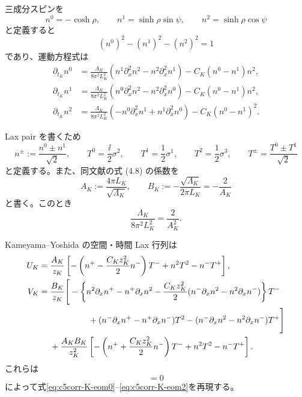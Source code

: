三成分スピンを
\begin{equation}
n^0=-\cosh\rho,
\qquad n^1=\sinh\rho\sin\psi,
\qquad n^2=\sinh\rho\cos\psi
\label{eq:c5corr-K-spin-rhopsi}
\end{equation}
と定義すると
\begin{equation}
(n^0)^2-(n^1)^2-(n^2)^2=1
\label{eq:c5corr-Kspin}
\end{equation}
であり、運動方程式は
\begin{align}
\partial_{t_K}n^0
&=\frac{\Lambda_K}{8\pi^2L_K^2}
(n^1\partial_x^2n^2-n^2\partial_x^2n^1)
-C_K(n^0-n^1)n^2,
\label{eq:c5corr-K-eom0}\\
\partial_{t_K}n^1
&=\frac{\Lambda_K}{8\pi^2L_K^2}
(n^0\partial_x^2n^2-n^2\partial_x^2n^0)
-C_K(n^0-n^1)n^2,
\label{eq:c5corr-K-eom1}\\
\partial_{t_K}n^2
&=\frac{\Lambda_K}{8\pi^2L_K^2}
(-n^0\partial_x^2n^1+n^1\partial_x^2n^0)
-C_K(n^0-n^1)^2.
\label{eq:c5corr-K-eom2}
\end{align}

Lax pair を書くため
\begin{equation}
n^\pm:=\frac{n^0\pm n^1}{\sqrt2},
\qquad
T^0=\frac{\ii}{2}\sigma^2,
\qquad T^1=\frac12\sigma^1,
\qquad T^2=\frac12\sigma^3,
\qquad T^\pm=\frac{T^0\pm T^1}{\sqrt2}
\label{eq:c5corr-Kgenerators}
\end{equation}
と定義する。また、同文献の式 (4.8) の係数を
\begin{equation}
A_K:=\frac{4\pi L_K}{\sqrt{\Lambda_K}},
\qquad
B_K:=-\frac{\sqrt{\Lambda_K}}{2\pi L_K}=-\frac{2}{A_K}
\label{eq:c5corr-Kconstants}
\end{equation}
と書く。このとき
\begin{equation}
\frac{\Lambda_K}{8\pi^2L_K^2}=\frac{2}{A_K^2}.
\end{equation}

Kameyama--Yoshida の空間・時間 Lax 行列は
\begin{align}
U_K={}&\frac{A_K}{z_K}
\left[-\left(n^+-\frac{C_Kz_K^2}{2}n^-\right)T^-
+n^2T^2-n^-T^+\right],
\label{eq:c5corr-UK}\\
V_K={}&\frac{B_K}{z_K}\Bigg[
-\left\{n^2\partial_xn^+-n^+\partial_xn^2
-\frac{C_Kz_K^2}{2}(n^-\partial_xn^2-n^2\partial_xn^-)\right\}T^-
\nonumber\\
&\hspace{16mm}
+(n^-\partial_xn^+-n^+\partial_xn^-)T^2
-(n^-\partial_xn^2-n^2\partial_xn^-)T^+
\Bigg]
\nonumber\\
&+\frac{A_KB_K}{z_K^2}
\left[-\left(n^++\frac{C_Kz_K^2}{2}n^-\right)T^-
+n^2T^2-n^-T^+\right].
\label{eq:c5corr-VK}
\end{align}
これらは
\begin{equation}
[\partial_{t_K}-V_K,\partial_x-U_K]=0
\label{eq:c5corr-K-flatness}
\end{equation}
によって式\eqref{eq:c5corr-K-eom0}--\eqref{eq:c5corr-K-eom2}を再現する。

